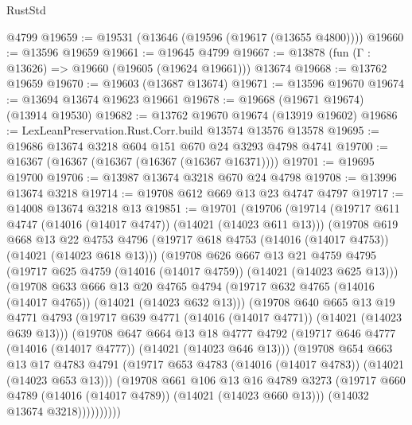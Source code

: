 \begin{lexlean}{RustStd}
\begin{coremodule}
    @4799
@19659 := @19531 (@13646 (@19596 (@19617 (@13655 @4800))))
@19660 := @13596 @19659
@19661 := @19645 @4799
@19667 := @13878 (fun (Γ : @13626) => @19660 (@19605 (@19624 @19661))) @13674
@19668 := @13762 @19659
@19670 := @19603 (@13687 @13674)
@19671 := @13596 @19670
@19674 := @13694 @13674 @19623 @19661
@19678 := @19668 (@19671 @19674) (@13914 @19530)
@19682 := @13762 @19670 @19674 (@13919 @19602)
@19686 := LexLeanPreservation.Rust.Corr.build @13574 @13576 @13578
@19695 := @19686 @13674 @3218 @604 @151 @670 @24 @3293 @4798 @4741
@19700 := @16367 (@16367 (@16367 (@16367 (@16367 @16371))))
@19701 := @19695 @19700
@19706 := @13987 @13674 @3218 @670 @24 @4798
@19708 := @13996 @13674 @3218
@19714 := @19708 @612 @669 @13 @23 @4747 @4797
@19717 := @14008 @13674 @3218 @13
@19851 := @19701
    (@19706
      (@19714
        (@19717 @611 @4747 (@14016 (@14017 @4747)) (@14021 (@14023 @611 @13)))
        (@19708
          @619
          @668
          @13
          @22
          @4753
          @4796
          (@19717 @618 @4753 (@14016 (@14017 @4753)) (@14021 (@14023 @618 @13)))
          (@19708
            @626
            @667
            @13
            @21
            @4759
            @4795
            (@19717 @625 @4759 (@14016 (@14017 @4759)) (@14021 (@14023 @625 @13)))
            (@19708
              @633
              @666
              @13
              @20
              @4765
              @4794
              (@19717 @632 @4765 (@14016 (@14017 @4765)) (@14021 (@14023 @632 @13)))
              (@19708
                @640
                @665
                @13
                @19
                @4771
                @4793
                (@19717 @639 @4771 (@14016 (@14017 @4771)) (@14021 (@14023 @639 @13)))
                (@19708
                  @647
                  @664
                  @13
                  @18
                  @4777
                  @4792
                  (@19717 @646 @4777 (@14016 (@14017 @4777)) (@14021 (@14023 @646 @13)))
                  (@19708
                    @654
                    @663
                    @13
                    @17
                    @4783
                    @4791
                    (@19717 @653 @4783 (@14016 (@14017 @4783)) (@14021 (@14023 @653 @13)))
                    (@19708
                      @661
                      @106
                      @13
                      @16
                      @4789
                      @3273
                      (@19717 @660 @4789 (@14016 (@14017 @4789)) (@14021 (@14023 @660 @13)))
                      (@14032 @13674 @3218))))))))))

\end{coremodule}
\end{lexlean}
